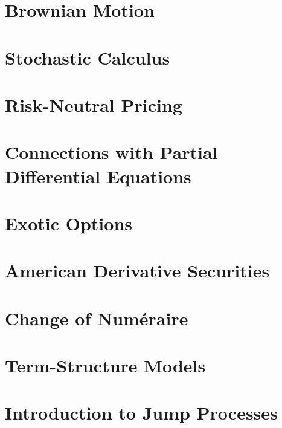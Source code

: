 \documentclass{article}
\begin{document}
\section{Brownian Motion}

\section{Stochastic Calculus}
\section{Risk-Neutral Pricing}
\section{Connections with Partial Differential Equations}
\section{Exotic Options}
\section{American Derivative Securities}
\section{Change of Numéraire}
\section{Term-Structure Models}
\section{Introduction to Jump Processes}
\end{document}
